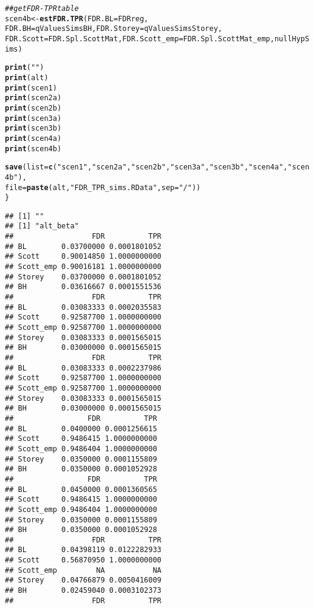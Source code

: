 \documentclass{article}\usepackage[]{graphicx}\usepackage[]{color}
\makeatletter
\newcommand{\hlstr}[1]{\textcolor[rgb]{0.192,0.494,0.8}{#1}}%
\newcommand{\hlcom}[1]{\textcolor[rgb]{0.678,0.584,0.686}{\textit{#1}}}%
\newcommand{\hlstd}[1]{\textcolor[rgb]{0.345,0.345,0.345}{#1}}%
\newcommand{\hlkwb}[1]{\textcolor[rgb]{0.69,0.353,0.396}{#1}}%
\newcommand{\hlkwc}[1]{\textcolor[rgb]{0.333,0.667,0.333}{#1}}%
\newcommand{\hlkwd}[1]{\textcolor[rgb]{0.737,0.353,0.396}{\textbf{#1}}}%
\newenvironment{kframe}{%
 \def\at@end@of@kframe{}%
 \ifinner\ifhmode%
  \def\at@end@of@kframe{\end{minipage}}%
  \begin{minipage}{\columnwidth}%
 \fi\fi%
 \def\FrameCommand##1{\hskip\@totalleftmargin \hskip-\fboxsep
 \colorbox{shadecolor}{##1}\hskip-\fboxsep
     \hskip-\linewidth \hskip-\@totalleftmargin \hskip\columnwidth}%
 \MakeFramed {\advance\hsize-\width
   \@totalleftmargin\z@ \linewidth\hsize
   \@setminipage}}%
 {\par\unskip\endMakeFramed%
 \at@end@of@kframe}
\newenvironment{knitrout}{}{} %
\makeatother
\begin{document}
\begin{knitrout}
\begin{kframe}
\begin{alltt}
  \hlcom{##get FDR-TPR table}
  \hlstd{scen4b} \hlkwb{<-} \hlkwd{estFDR.TPR}\hlstd{(}\hlkwc{FDR.BL} \hlstd{= FDRreg,}
                       \hlkwc{FDR.BH} \hlstd{= qValuesSimsBH,} \hlkwc{FDR.Storey} \hlstd{= qValuesSimsStorey,}
                       \hlkwc{FDR.Scott} \hlstd{= FDR.Spl.ScottMat,} \hlkwc{FDR.Scott_emp} \hlstd{= FDR.Spl.ScottMat_emp, nullHypSims)}

  \hlkwd{print}\hlstd{(}\hlstr{""}\hlstd{)}
  \hlkwd{print}\hlstd{(alt)}
  \hlkwd{print}\hlstd{(scen1)}
  \hlkwd{print}\hlstd{(scen2a)}
  \hlkwd{print}\hlstd{(scen2b)}
  \hlkwd{print}\hlstd{(scen3a)}
  \hlkwd{print}\hlstd{(scen3b)}
  \hlkwd{print}\hlstd{(scen4a)}
  \hlkwd{print}\hlstd{(scen4b)}

  \hlkwd{save}\hlstd{(}\hlkwc{list}\hlstd{=}\hlkwd{c}\hlstd{(}\hlstr{"scen1"}\hlstd{,}\hlstr{"scen2a"}\hlstd{,}\hlstr{"scen2b"}\hlstd{,}\hlstr{"scen3a"}\hlstd{,}\hlstr{"scen3b"}\hlstd{,}\hlstr{"scen4a"}\hlstd{,}\hlstr{"scen4b"}\hlstd{),}
       \hlkwc{file}\hlstd{=}\hlkwd{paste}\hlstd{(alt,}\hlstr{"FDR_TPR_sims.RData"}\hlstd{,}\hlkwc{sep}\hlstd{=}\hlstr{"/"}\hlstd{))}
\hlstd{\}}
\end{alltt}
\begin{verbatim}
## [1] ""
## [1] "alt_beta"
##                  FDR          TPR
## BL        0.03700000 0.0001801052
## Scott     0.90014850 1.0000000000
## Scott_emp 0.90016181 1.0000000000
## Storey    0.03700000 0.0001801052
## BH        0.03616667 0.0001551536
##                  FDR          TPR
## BL        0.03083333 0.0002035583
## Scott     0.92587700 1.0000000000
## Scott_emp 0.92587700 1.0000000000
## Storey    0.03083333 0.0001565015
## BH        0.03000000 0.0001565015
##                  FDR          TPR
## BL        0.03083333 0.0002237986
## Scott     0.92587700 1.0000000000
## Scott_emp 0.92587700 1.0000000000
## Storey    0.03083333 0.0001565015
## BH        0.03000000 0.0001565015
##                 FDR          TPR
## BL        0.0400000 0.0001256615
## Scott     0.9486415 1.0000000000
## Scott_emp 0.9486404 1.0000000000
## Storey    0.0350000 0.0001155809
## BH        0.0350000 0.0001052928
##                 FDR          TPR
## BL        0.0450000 0.0001360565
## Scott     0.9486415 1.0000000000
## Scott_emp 0.9486404 1.0000000000
## Storey    0.0350000 0.0001155809
## BH        0.0350000 0.0001052928
##                  FDR          TPR
## BL        0.04398119 0.0122282933
## Scott     0.56870950 1.0000000000
## Scott_emp         NA           NA
## Storey    0.04766879 0.0050416009
## BH        0.02459040 0.0003102373
##                  FDR          TPR

\end{verbatim}
\end{kframe}
\end{knitrout}
\end{document}
